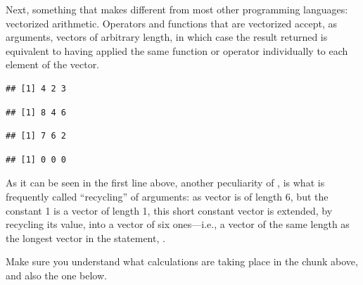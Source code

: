 \documentclass[krantz2]{krantz}\usepackage{knitr}
\begin{document}
Next, something that makes \Rlang different from most other programming languages: vectorized arithmetic. Operators and functions that are vectorized accept, as arguments, vectors of arbitrary length, in which case the result returned is equivalent to having applied the same function or operator individually to each element of the vector.\label{par:vectorized:numeric}

\begin{knitrout}\footnotesize
{}\color{fgcolor}\begin{kframe}
\begin{alltt}
 \hlopt{+}  
\end{alltt}
\begin{verbatim}
## [1] 4 2 3
\end{verbatim}
\begin{alltt}
 \hlopt{+} \hlstd{)} \hlopt{*} 
\end{alltt}
\begin{verbatim}
## [1] 8 4 6
\end{verbatim}
\begin{alltt}
 \hlopt{+} 
\end{alltt}
\begin{verbatim}
## [1] 7 6 2
\end{verbatim}
\begin{alltt}
 \hlopt{-} 
\end{alltt}
\begin{verbatim}
## [1] 0 0 0
\end{verbatim}
\end{kframe}
\end{knitrout}

As it can be seen in the first line above, another peculiarity of \Rpgrm, is what is frequently called ``recycling'' of arguments: as vector  is of length 6, but the constant 1 is a vector of length 1, this short constant vector is extended, by recycling its value, into a vector of six ones---i.e., a vector of the same length as the longest vector in the statement, .\label{par:recycling:numeric}

Make sure you understand what calculations are taking place in the chunk above, and also the one below.
\end{document}
